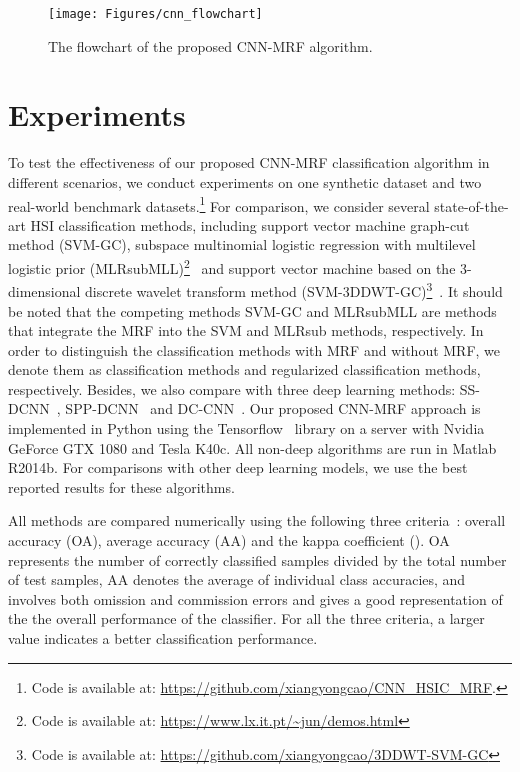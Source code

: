 \documentclass[journal]{IEEEtran}
\begin{document}
		\begin{figure}[t]
			\centering
			\texttt{[image: Figures/cnn\_flowchart]}
			\caption{{{The flowchart of the proposed CNN-MRF algorithm.}}}\label{flowchart}
		\end{figure}
		
		\section{Experiments}
		To test the effectiveness of our proposed CNN-MRF {{classification}} algorithm in different scenarios, we conduct experiments on one synthetic dataset and two real-world benchmark datasets.\footnote{Code is available at: \url{https://github.com/xiangyongcao/CNN_HSIC_MRF}.} For comparison, we consider several state-of-the-art HSI {{classification}} methods, including support vector machine graph-cut method (SVM-GC), subspace multinomial logistic regression with multilevel logistic prior (MLRsubMLL)\footnote{Code is available at: \url{https://www.lx.it.pt/~jun/demos.html}}~\cite{li2012spectral} and support vector machine based on the 3-dimensional discrete wavelet transform method ({{SVM-3DDWT-GC}})\footnote{Code is available at: \url{https://github.com/xiangyongcao/3DDWT-SVM-GC}}~\cite{cao2017integration}. {{It should be noted that the competing methods SVM-GC and MLRsubMLL are methods that integrate the MRF into the SVM and MLRsub methods, respectively. In order 
to distinguish the classification methods with MRF and without MRF, we denote them as classification methods and regularized classification methods, respectively.}} Besides, we also compare with three deep learning methods: SS-DCNN~\cite{yue2015spectral}, SPP-DCNN~\cite{yue2016deep} and DC-CNN~\cite{zhang2017spectral}. Our proposed CNN-MRF approach is implemented in Python using the Tensorflow~\cite{abadi2016tensorflow} library on a server with Nvidia 
		GeForce GTX 1080 and Tesla K40c. All non-deep algorithms are run in Matlab R2014b. For comparisons with other deep learning models, we use the best reported results for these algorithms. 
		
		All methods are compared numerically using the following three criteria~\cite{cao2017integration}: overall accuracy (OA), average accuracy (AA) and the kappa coefficient (). OA represents the number of correctly classified samples divided by the total number of test samples, AA denotes the average of individual class accuracies, and  involves both omission and commission errors and gives a good representation of the the overall performance of the classifier. For all the three criteria, a larger value indicates a better classification performance.
		
\end{document}

